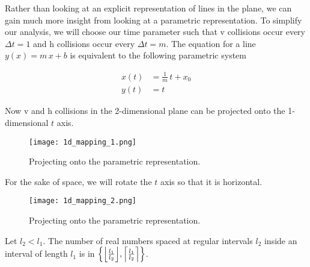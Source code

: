 
Rather than looking at an explicit representation of lines in the plane, we can gain much more insight from looking at a parametric representation. To simplify our analysis, we will choose our time parameter such that v collisions occur every $\Delta t = 1$ and h collisions occur every $\Delta t = m$. The equation for a line $y(x) = m \, x + b$ is equivalent to the following parametric system

\begin{align}\label{eq:parametric-line}
	x(t)& = \frac{1}{m} \, t + x_0\\
	y(t)& = t
\end{align}

Now v and h collisions in the 2-dimensional plane can be projected onto the 1-dimensional $t$ axis.

\begin{figure}[H]
  \begin{center}
    \texttt{[image: 1d\_mapping\_1.png]}
  \end{center}
  \vspace{-.2in} %
  \caption{\label{fig:1d-projection} Projecting onto the parametric representation.}
\end{figure}

For the sake of space, we will rotate the $t$ axis so that it is horizontal.

\begin{figure}[H]
  \begin{center}
    \texttt{[image: 1d\_mapping\_2.png]}
  \end{center}
  \vspace{-.2in} %
  \caption{\label{fig:1d-problem} Projecting onto the parametric representation.}
\end{figure}


\begin{lemma}\label{lem:interval-ticks}
	Let $l_2 < l_1$. The number of real numbers spaced at regular intervals $l_2$ inside an interval of length $l_1$ is in $\cbracket{\floor{\frac{l_1}{l_2}}, \ceil{\frac{l_1}{l_2}}}$.
\end{lemma}

